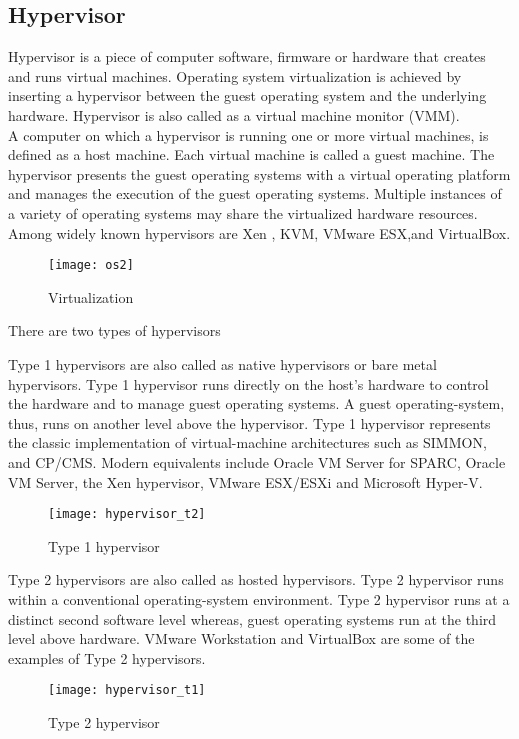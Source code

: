 \subsection{Hypervisor}

Hypervisor is a piece of computer software, firmware or hardware that creates and runs virtual machines. Operating system virtualization is achieved by inserting a hypervisor between the guest operating system and the underlying hardware. Hypervisor is also called as a virtual machine monitor (VMM).
\\
A computer on which a hypervisor is running one or more virtual machines, is defined as a host machine. Each virtual machine is called a guest machine. The hypervisor presents the guest operating systems with a virtual operating platform and manages the execution of the guest operating systems. Multiple instances of a variety of operating systems may share the virtualized hardware resources. Among widely known hypervisors are Xen \cite{Barham:2003:XAV:1165389.945462}\cite{Chisnall:2007:DGX:1407351}, KVM\cite{Habib:2008:VK:1344209.1344217}\cite{kivity07kvm}, VMware ESX\cite{Agesen:2010:EXV:1899928.1899930},and VirtualBox\cite{citeulike:3149886}.
\\
\begin{figure}[!ht]
\centering
\texttt{[image: os2]}
\caption{Virtualization}
\label{fig:Virtualization}
\end{figure}
There are two types of hypervisors \cite{Goldberg:1973:AVM:800122.803950}
\begin{description}
\item Type 1 hypervisors are also called as native hypervisors or bare metal hypervisors. Type 1 hypervisor runs directly on the host's hardware to control the hardware and to manage guest operating systems. A guest operating-system, thus, runs on another level above the hypervisor. Type 1 hypervisor represents the classic implementation of virtual-machine architectures such as SIMMON, and CP/CMS. Modern equivalents include Oracle VM Server for SPARC, Oracle VM Server, the Xen hypervisor\cite{Barham:2003:XAV:1165389.945462}, VMware ESX/ESXi\cite{Agesen:2010:EXV:1899928.1899930} and Microsoft Hyper-V.
\end{description}
\begin{figure}[!ht]
\centering
\texttt{[image: hypervisor\_t2]}
\caption{Type 1 hypervisor}
\label{fig:Type 1 hypervisor}
\end{figure}
\begin{description}
\item Type 2 hypervisors are also called as hosted hypervisors. Type 2 hypervisor runs within a conventional operating-system environment. Type 2 hypervisor runs at a distinct second software level whereas, guest operating systems run at the third level above hardware. VMware Workstation and VirtualBox are some of the examples of Type 2 hypervisors.\cite{Sugerman:2001:VID:647055.715774}\cite{citeulike:3149886}
\end{description}
\begin{figure}[!ht]
\centering
\texttt{[image: hypervisor\_t1]}
\caption{Type 2 hypervisor}
\label{fig:Type 2 hypervisor}
\end{figure}

